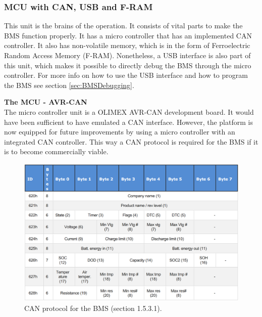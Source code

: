 \subsubsection{MCU with CAN, USB and F-RAM}
This unit is the brains of the operation. It consists of vital parts to make the BMS function properly. It has a micro controller that has an implemented CAN controller. It also has non-volatile memory, which is in the form of Ferroelectric Random Access Memory (F-RAM). Nonetheless, a USB interface is also part of this unit, which makes it possible to directly debug the BMS through the micro controller. For more info on how to use the USB interface and how to program the BMS see section \vref{sec:BMSDebugging}.

\textbf{The MCU - AVR-CAN}\\
The micro controller unit is a OLIMEX AVR-CAN development board. It would have been sufficient to have emulated a CAN interface. However, the platform is now equipped for future improvements by using a micro controller with an integrated CAN controller. This way a CAN protocol is required for the BMS if it is to become commercially viable.

\begin{figure}[H]
	\centering
	\includegraphics[width=1.0\linewidth]{Hardware/Pictures/BMSCANProto}
	\caption[Empty]{CAN protocol for the BMS \cite{BMSDocumentation} (section 1.5.3.1).}
	\label{fig:BMSCANProto}
\end{figure}

